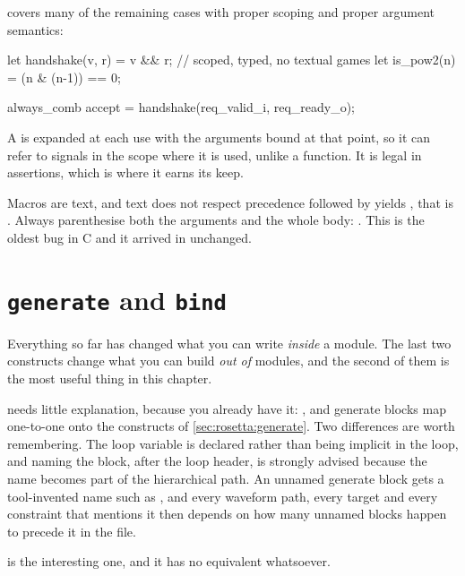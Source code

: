  covers many of the remaining cases with proper scoping and proper
argument semantics:

\begin{svcode}
let handshake(v, r) = v && r;          // scoped, typed, no textual games
let is_pow2(n)      = (n & (n-1)) == 0;

always_comb accept = handshake(req_valid_i, req_ready_o);
\end{svcode}

A  is expanded at each use with the arguments bound at that point,
so it can refer to signals in the scope where it is used, unlike a function.
It is legal in assertions, which is where it earns its keep.

\begin{gotcha}{Macros are text, and text does not respect precedence}
 followed by  yields
, that is . Always parenthesise both the arguments and
the whole body: . This is the oldest bug in
C and it arrived in \SV{} unchanged.
\end{gotcha}

\section{\texttt{generate} and \texttt{bind}}
\label{sec:beyond:bind}

Everything so far has changed what you can write \emph{inside} a module. The
last two constructs change what you can build \emph{out of} modules, and the
second of them is the most useful thing in this chapter.

 needs little explanation, because you already have it:
,  and  generate blocks map one-to-one onto the
\VHDL{} constructs of \cref{sec:rosetta:generate}. Two differences are worth
remembering. The loop variable is declared  rather than being
implicit in the loop, and naming the block,  after the loop
header, is strongly advised because the name becomes part of the hierarchical
path. An unnamed generate block gets a tool-invented name such as
, and every waveform path, every  target and every
constraint that mentions it then depends on how many unnamed blocks happen to
precede it in the file.

 is the interesting one, and it has no \VHDL{} equivalent whatsoever.

